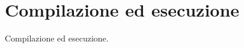 
\section*{Compilazione ed esecuzione}
%
\label{sec:compilazione_esecuzione}

Compilazione ed esecuzione.